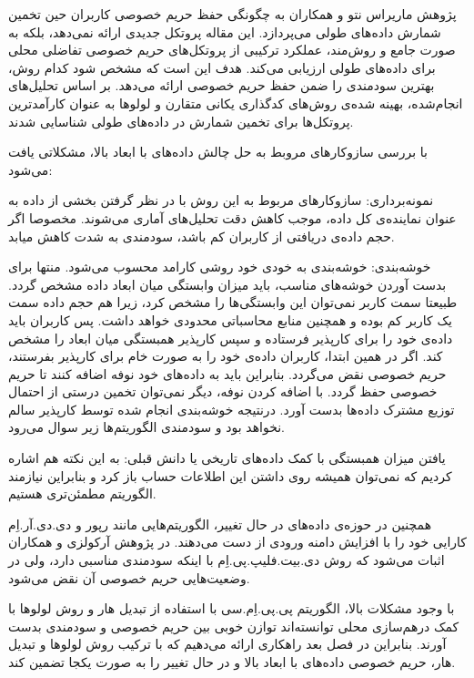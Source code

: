 


پژوهش ماریراس نتو و همکاران  به چگونگی حفظ حریم خصوصی کاربران حین تخمین شمارش داده‌های طولی می‌پردازد. این مقاله پروتکل جدیدی ارائه نمی‌دهد، بلکه به صورت جامع و روش‌مند، عملکرد ترکیبی از پروتکل‌های حریم خصوصی تفاضلی محلی برای داده‌های طولی ارزیابی می‌کند. هدف این است که مشخص شود کدام روش، بهترین سودمندی را ضمن حفظ حریم خصوصی ارائه می‌دهد. بر اساس تحلیل‌های انجام‌شده، بهینه شده‌ی روش‌های کدگذاری یکانی متقارن و لولوها به عنوان کارآمدترین پروتکل‌ها برای تخمین شمارش در داده‌های طولی شناسایی شدند.


با بررسی سازوکارهای مروبط به حل چالش داده‌های با ابعاد بالا، مشکلاتی یافت می‌شود:


 نمونه‌برداری: سازوکارهای مربوط به این روش با در نظر گرفتن بخشی از داده به عنوان نماینده‌ی کل داده، موجب کاهش دقت تحلیل‌های آماری می‌شوند. مخصوصا اگر حجم داده‌ی دریافتی از کاربران کم باشد، سودمندی به شدت کاهش میابد.

 خوشه‌بندی: خوشه‌بندی به خودی خود روشی کارامد محسوب می‌شود. منتها برای بدست آوردن خوشه‌های مناسب، باید میزان وابستگی میان ابعاد داده مشخص گردد. طبیعتا سمت کاربر نمی‌توان این وابستگی‌ها را مشخص کرد، زیرا هم حجم داده سمت یک کاربر کم بوده و همچنین منابع محاسباتی محدودی خواهد داشت. پس کاربران باید داده‌ی خود را برای کارپذیر فرستاده و سپس کارپذیر همبستگی میان ابعاد را مشخص کند. اگر در همین ابتدا، کاربران داده‌ی خود را به صورت خام برای کارپذیر بفرستند، حریم خصوصی نقض می‌گردد. بنابراین باید به داده‌های خود نوفه اضافه کنند تا حریم خصوصی حفظ گردد. با اضافه کردن نوفه، دیگر نمی‌توان تخمین درستی از احتمال توزیع مشترک داده‌ها بدست آورد. درنتیجه خوشه‌بندی انجام شده توسط کارپذیر سالم نخواهد بود و سودمندی الگوریتم‌ها زیر سوال می‌رود.

 یافتن میزان همبستگی با کمک داده‌های تاریخی یا دانش قبلی: به این نکته هم اشاره کردیم که نمی‌توان همیشه روی داشتن این اطلاعات حساب باز کرد و بنابراین نیازمند الگوریتم مطمئن‌تری هستیم.


همچنین در حوزه‌ی داده‌های در حال تغییر، الگوریتم‌هایی مانند رپور و دی.دی.آر.اِم  کارایی خود را با افزایش دامنه ورودی از دست می‌دهند. در پژوهش آرکولزی و همکاران  اثبات می‌شود که روش دی.بیت.فلیپ.پی.اِم با اینکه سودمندی مناسبی دارد، ولی در وضعیت‌هایی حریم خصوصی آن نقض می‌شود. 

با وجود مشکلات بالا، الگوریتم پی.پی.اِم.سی با استفاده از تبدیل هار و روش لولوها با کمک درهم‌سازی محلی توانسته‌اند توازن خوبی بین حریم خصوصی و سودمندی بدست آورند. بنابراین در فصل بعد راهکاری ارائه می‌دهیم که با ترکیب روش لولوها و تبدیل هار، حریم خصوصی داده‌های با ابعاد بالا و در حال تغییر را به صورت یکجا تضمین کند. 




